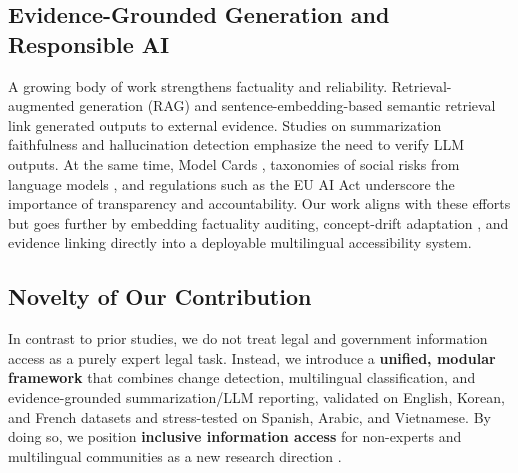 {\subsection{Evidence-Grounded Generation and Responsible AI}
A growing body of work strengthens factuality and reliability. Retrieval-augmented generation (RAG) \cite{lewis2020rag} and sentence-embedding-based semantic retrieval \cite{reimers2019sbert, reimers2020multilingual} link generated outputs to external evidence.
Studies on summarization faithfulness \cite{maynez2020faithfulness} and hallucination detection \cite{ji2023hallucination} emphasize the need to verify LLM outputs.
At the same time, Model Cards \cite{mitchell2021modelcards}, taxonomies of social risks from language models \cite{weidinger2021taxonomy, bender2021stochastic}, and regulations such as the EU AI Act \cite{EUAIAct2024} underscore the importance of transparency and accountability.
Our work aligns with these efforts but goes further by embedding factuality auditing, concept-drift adaptation \cite{gama2014drift}, and evidence linking directly into a deployable multilingual accessibility system.

\subsection{Novelty of Our Contribution}
In contrast to prior studies, we do not treat legal and government information access as a purely expert legal task.
Instead, we introduce a \textbf{unified, modular framework} that combines change detection, multilingual classification, and evidence-grounded summarization/LLM reporting,
validated on English, Korean, and French datasets and stress-tested on Spanish, Arabic, and Vietnamese.
By doing so, we position \textbf{inclusive information access} for non-experts and multilingual communities as a new research direction \cite{devlin2019bert, bommasani2021foundation}.

}

